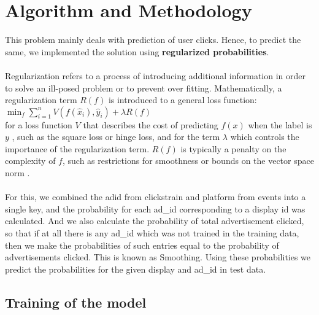 \documentclass[fleqn,10pt]{SelfArx} %
\begin{document}
\section{Algorithm and Methodology}
This problem mainly deals with prediction of user clicks. Hence, to predict the same, we implemented the solution using \textbf{regularized probabilities}.  
\paragraph{}Regularization refers to a process of introducing additional information in order to solve an ill-posed problem or to prevent over fitting. Mathematically, a regularization term ${\displaystyle R(f)}$ is introduced to a general loss function:\\
${\displaystyle \min _{f}\sum _{i=1}^{n}V(f({\hat {x}}_{i}),{\hat {y}}_{i})+\lambda R(f)}$ \\
for a loss function ${\displaystyle V}$  that describes the cost of predicting ${\displaystyle f(x)}$  when the label is ${\displaystyle y}$ , such as the square loss or hinge loss, and for the term ${\displaystyle \lambda }$  which controls the importance of the regularization term. ${\displaystyle R(f)}$ is typically a penalty on the complexity of ${\displaystyle f}$, such as restrictions for smoothness or bounds on the vector space norm \cite{REF:4}.
\\ \\For this, we combined the ad\textunderscore id from clicks\textunderscore train and platform from events into a single key, and the probability for each ad\_id corresponding to a display id was calculated. And we also calculate the probability of total advertisement clicked, so that if at all there is any ad\_id which was not trained in the training data, then we make the probabilities of such entries equal to the probability of advertisements clicked. This is known as Smoothing. Using these probabilities we predict the probabilities for the given display and ad\_id in test data. 
\subsection{Training of the model}
\end{document}
